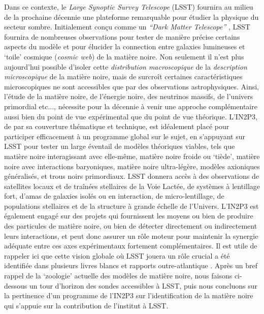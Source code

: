 \documentclass[12pt]{article}
\begin{document}
Dans ce contexte, le {\it Large Synoptic Survey Telescope} (LSST) fournira au milieu de la prochaine décennie une plateforme remarquable pour étudier la physique du secteur sombre. Initialement conçu comme un {\it ``Dark Matter Telescope''} \citep{Tyson:2001}, LSST fournira de nombreuses observations pour tester de manière précise certains aspects du modèle \LCDM et pour élucider la connection entre galaxies lumineuses et `toile' cosmique ({\it cosmic web}) de la matière noire. Non seulement il n'est plus aujourd'hui possible d'isoler cette \emph{distribution macroscopique} de la \emph{description microscopique} de la matière noire, mais de surcroît certaines caractéristiques microscopiques ne sont accessibles que par des observations astrophysiques. 
Ainsi, l'étude de la matière noire, de l'énergie noire, des neutrinos massifs, de l'univers primordial etc..., nécessite pour la décennie à venir une approche complémentaire aussi bien du point de vue expérimental que du point de vue théorique. L'IN2P3, de par sa couverture thématique et technique, est idéalement placé pour participer efficacement à un programme global sur le sujet, en s'appuyant sur LSST pour tester un large éventail de modèles théoriques viables, tels que matière noire interagissant avec elle-même, matière noire froide ou `tiède', matière noire avec interactions baryoniques, matière noire ultra-légère, modèles axioniques généralisés, et trous noirs primordiaux. LSST donnera accès à des observations de satellites locaux et de traînées stellaires de la Voie Lactée, de systèmes à lentillage fort, d'amas de galaxies isolés ou en interaction, de micro-lentillage, de populations stellaires et de la structure à grande échelle de l'Univers. L'IN2P3 est également engagé sur des projets qui fournissent les moyens ou bien de produire des particules de matière noire, ou bien de détecter directement ou indirectement leurs interactions, et peut donc assurer un rôle moteur pour maintenir la synergie adéquate entre ces axes expérimentaux fortement complémentaires. Il est utile de rappeler ici que cette vision globale où LSST jouera un rôle crucial a été identifiée dans plusieurs livres blancs et rapports outre-atlantique \citep{Astro2010,1310.8642, 1310.5662, 1305.1605,P5Report,1604.07626,1802.07216,Battaglieri:2017aum}. Après un bref rappel de la `zoologie' actuelle des modèles de matière noire, nous faisons ci-dessous un tour d'horizon des sondes accessibles à LSST, puis nous concluons sur la pertinence d'un programme de l'IN2P3 sur l'identification de la matière noire qui s'appuie sur la contribution de l'institut à LSST.
\end{document}
